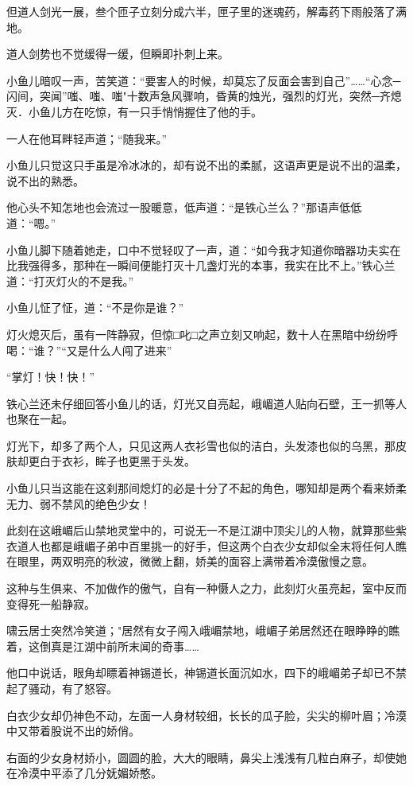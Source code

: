 \documentclass[12pt,oneside]{book}
\begin{document}
但道人剑光一展，叁个匝子立刻分成六半，匣子里的迷魂药，解毒药下雨般落了满地。

道人剑势也不觉缓得一缓，但瞬即扑刺上来。

小鱼儿暗叹一声，苦笑道：``要害人的时候，却莫忘了反面会害到自己''\ldots\ldots{}``心念─闪间，突闻''嗤、嗤、嗤"十数声急风骤响，昏黄的烛光，强烈的灯光，突然─齐熄灭．小鱼儿方在吃惊，有一只手悄悄握住了他的手。

一人在他耳畔轻声道；``随我来。''

小鱼儿只觉这只手虽是冷冰冰的，却有说不出的柔腻，这语声更是说不出的温柔，说不出的熟悉。

他心头不知怎地也会流过一股暖意，低声道：``是铁心兰么？''那语声低低道：``嗯。''

小鱼儿脚下随着她走，口中不觉轻叹了一声，道：``如今我才知道你暗器功夫实在比我强得多，那种在一瞬间便能打灭十几盏灯光的本事，我实在比不上。''铁心兰道：``打灭灯火的不是我。''

小鱼儿怔了怔，道：``不是你是谁？''

灯火熄灭后，虽有一阵静寂，但惊□叱□之声立刻又响起，数十人在黑暗中纷纷呼喝：``谁？''``又是什么人闯了进来''

``掌灯！快！快！''

铁心兰还未仔细回答小鱼儿的话，灯光又自亮起，峨嵋道人贴向石壁，王一抓等人也聚在一起。

灯光下，却多了两个人，只见这两人衣衫雪也似的洁白，头发漆也似的乌黑，那皮肤却更白于衣衫，眸子也更黑于头发。

小鱼儿只当这能在这刹那间熄灯的必是十分了不起的角色，哪知却是两个看来娇柔无力、弱不禁风的绝色少女！

此刻在这峨嵋后山禁地灵堂中的，可说无一不是江湖中顶尖儿的人物，就算那些紫衣道人也都是峨嵋子弟中百里挑一的好手，但这两个白衣少女却似全末将任何人瞧在眼里，两双明亮的秋波，微微上翻，娇美的面容上满带着冷漠傲慢之意。

这种与生俱来、不加做作的傲气，自有一种慑人之力，此刻灯火虽亮起，室中反而变得死一船静寂。

啸云居士突然冷笑道；"居然有女子闯入峨嵋禁地，峨嵋子弟居然还在眼睁睁的瞧着，这倒真是江湖中前所末闻的奇事\ldots\ldots{}

他口中说话，眼角却瞟着神锡道长，神锡道长面沉如水，四下的峨嵋弟子却已不禁起了骚动，有了怒容。

白衣少女却仍神色不动，左面一人身材较细，长长的瓜子脸，尖尖的柳叶眉；冷漠中又带着股说不出的娇俏。

右面的少女身材娇小，圆圆的脸，大大的眼睛，鼻尖上浅浅有几粒白麻子，却使她在冷漠中平添了几分妩媚娇憨。
\end{document}
